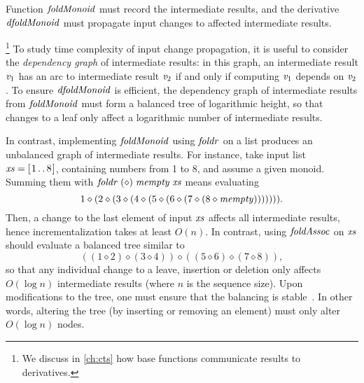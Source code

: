 Function \ensuremath{\Varid{foldMonoid}} must record the intermediate results, and the derivative
\ensuremath{\Varid{dfoldMonoid}} must propagate input changes to affected intermediate
results.%

\footnote{We discuss in \cref{ch:cts} how base functions communicate results to derivatives.}
To study time complexity  of input change propagation, it is useful to consider
the \emph{dependency graph} of intermediate results: in this graph, an
intermediate result \ensuremath{\Varid{v}_{1}} has an arc to intermediate result \ensuremath{\Varid{v}_{2}} if and only if computing \ensuremath{\Varid{v}_{1}}
depends on \ensuremath{\Varid{v}_{2}}.
To ensure \ensuremath{\Varid{dfoldMonoid}} is efficient, the dependency graph of intermediate
results from \ensuremath{\Varid{foldMonoid}} must form a balanced tree of logarithmic height, so
that changes to a leaf only affect a logarithmic number of intermediate
results.

In contrast, implementing \ensuremath{\Varid{foldMonoid}} using \ensuremath{\Varid{foldr}} on a list produces an
unbalanced graph of intermediate results.
For instance, take input list \ensuremath{\Varid{xs}\mathrel{=}[\mskip1.5mu \mathrm{1}\mathinner{\ldotp\ldotp}\mathrm{8}\mskip1.5mu]}, containing numbers from 1 to 8, and
assume a given monoid.
Summing them with \ensuremath{\Varid{foldr}\;( \diamond )\;\Varid{mempty}\;\Varid{xs}} means evaluating
\[\mathrm{1} \diamond (\mathrm{2} \diamond (\mathrm{3} \diamond (\mathrm{4} \diamond (\mathrm{5} \diamond (\mathrm{6} \diamond (\mathrm{7} \diamond (\mathrm{8} \diamond \mathit{mempty}))))))).\]
Then, a change to the last element of input \ensuremath{\Varid{xs}} affects all intermediate
results, hence incrementalization takes at least $O(n)$.
In contrast, using \ensuremath{\Varid{foldAssoc}} on \ensuremath{\Varid{xs}} should evaluate a balanced tree similar to
\[\ensuremath{((\mathrm{1} \diamond \mathrm{2}) \diamond (\mathrm{3} \diamond \mathrm{4})) \diamond ((\mathrm{5} \diamond \mathrm{6}) \diamond (\mathrm{7} \diamond \mathrm{8}))},\]
so that any individual change to a leave, insertion or
deletion only affects $O(\log n)$ intermediate results (where $n$ is the
sequence size).
Upon modifications to the tree, one must ensure that the balancing is
stable~\citep[Sec.~9.1]{Acar05}.
In other words, altering the tree (by inserting or removing an element) must only alter
$O(\log n)$ nodes.


